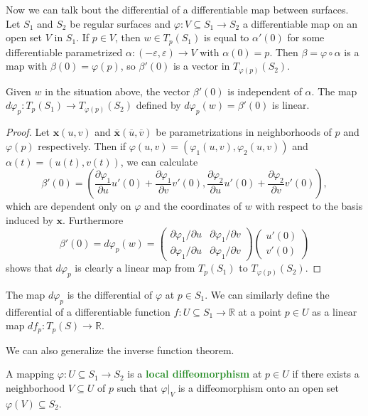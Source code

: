\documentclass[10pt]{scrartcl}
\providecommand{\ol}{\overline}
\providecommand{\eps}{\varepsilon}
\providecommand{\RR}{\mathbb R}
\providecommand{\mb}[1]{\mathbf{#1}}
\providecommand{\vocab}[1]{{\textbf{\textcolor{ForestGreen}{#1}}}}
\begin{document}
Now we can talk bout the differential of a differentiable map between surfaces.
Let $S_1$ and $S_2$ be regular surfaces and
$\varphi\colon V\subseteq S_1\to S_2$ a differentiable map on
an open set $V$ in $S_1$. If $p\in V$, then $w\in T_p(S_1)$
is equal to $\alpha'(0)$ for some differentiable parametrized
$\alpha\colon(-\eps,\eps)\to V$ with $\alpha(0) = p$.
Then $\beta = \varphi\circ\alpha$ is a map with $\beta(0) = \varphi(p)$,
so $\beta'(0)$ is a vector in $T_{\varphi(p)}(S_2)$.

\begin{prop}
	Given $w$ in the situation above, the vector $\beta'(0)$
	is independent of $\alpha$.
	The map $d\varphi_p\colon T_p(S_1)\to T_{\varphi(p)}(S_2)$
	defined by $d\varphi_p(w) = \beta'(0)$ is linear.
\end{prop}

\begin{proof}
	Let $\mb x(u,v)$ and $\ol{\mb x}(\ol u,\ol v)$ be parametrizations
	in neighborhoods of $p$ and $\varphi(p)$ respectively.
	Then if $\varphi(u,v) = (\varphi_1(u,v), \varphi_2(u,v))$
	and $\alpha(t) = (u(t),v(t))$, we can calculate
	\[\beta'(0) = \left(\frac{\partial\varphi_1}{\partial u}u'(0)
	+ \frac{\partial\varphi_1}{\partial v}v'(0),
	\frac{\partial\varphi_2}{\partial u}u'(0)
	+ \frac{\partial\varphi_2}{\partial v}v'(0)\right),\]
	which are dependent only on $\varphi$ and the coordinates of $w$
	with respect to the basis induced by $\mb x$. Furthermore
	\[\beta'(0) = d\varphi_p(w) =\begin{pmatrix}
		\partial\varphi_1/\partial u&
		\partial\varphi_1/\partial v\\
		\partial\varphi_1/\partial u&
		\partial\varphi_1/\partial v
	\end{pmatrix}\begin{pmatrix}
		u'(0)\\v'(0)
	\end{pmatrix}\]
	shows that $d\varphi_p$ is clearly a linear map from
	$T_p(S_1)$ to $T_{\varphi(p)}(S_2)$.
\end{proof}

The map $d\varphi_p$ is the differential of $\varphi$ at $p\in S_1$.
We can similarly define the differential of a differentiable function
$f\colon U\subseteq S_1\to\RR$ at a point $p\in U$
as a linear map $df_p\colon T_p(S)\to\RR$.

We can also generalize the inverse function theorem.
\begin{definition}
	A mapping $\varphi\colon U\subseteq S_1\to S_2$ is
	a \vocab{local diffeomorphism} at $p\in U$
	if there exists a neighborhood $V\subseteq U$ of $p$
	such that $\varphi|_V$ is a diffeomorphism onto
	an open set $\varphi(V)\subseteq S_2$.
\end{definition}
\end{document}

